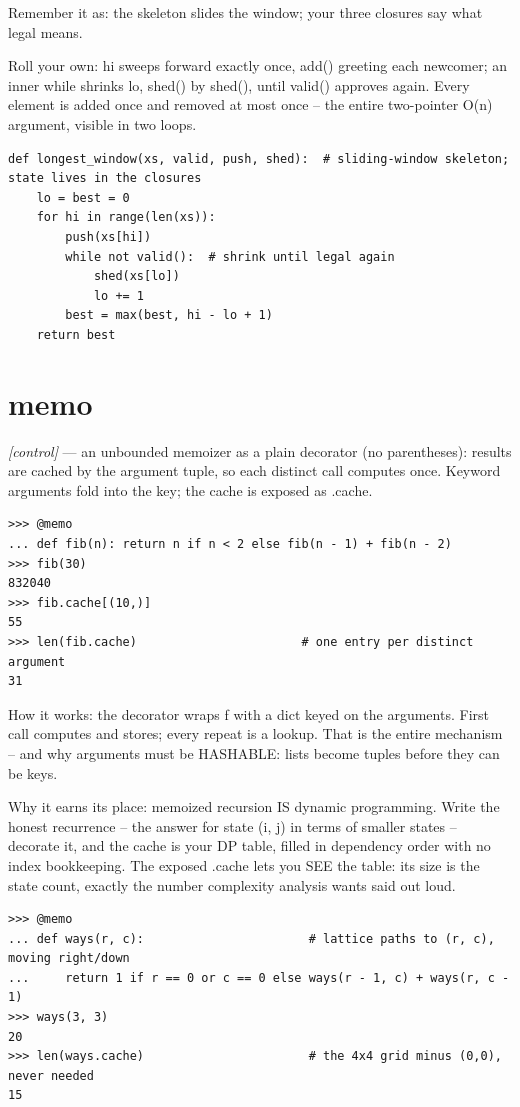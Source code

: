 \documentclass[11pt,letterpaper]{book}
\begin{document}
Remember it as: the skeleton slides the window; your three closures say what legal means.


Roll your own: hi sweeps forward exactly once, add() greeting each newcomer; an inner while shrinks lo, shed() by shed(), until valid() approves again. Every element is added once and removed at most once -- the entire two-pointer O(n) argument, visible in two loops.

\begin{lstlisting}[style=code]
def longest_window(xs, valid, push, shed):  # sliding-window skeleton; state lives in the closures
    lo = best = 0
    for hi in range(len(xs)):
        push(xs[hi])
        while not valid():  # shrink until legal again
            shed(xs[lo])
            lo += 1
        best = max(best, hi - lo + 1)
    return best
\end{lstlisting}

\section{memo}
\noindent\textit{[control]} --- an unbounded memoizer as a plain decorator (no parentheses): results are cached by the argument tuple, so each distinct call computes once. Keyword arguments fold into the key; the cache is exposed as .cache.
\begin{lstlisting}[style=spec]
>>> @memo
... def fib(n): return n if n < 2 else fib(n - 1) + fib(n - 2)
>>> fib(30)
832040
>>> fib.cache[(10,)]
55
>>> len(fib.cache)                       # one entry per distinct argument
31
\end{lstlisting}

How it works: the decorator wraps f with a dict keyed on the arguments. First call computes and stores; every repeat is a lookup. That is the entire mechanism -- and why arguments must be HASHABLE: lists become tuples before they can be keys.


Why it earns its place: memoized recursion IS dynamic programming. Write the honest recurrence -- the answer for state (i, j) in terms of smaller states -- decorate it, and the cache is your DP table, filled in dependency order with no index bookkeeping. The exposed .cache lets you SEE the table: its size is the state count, exactly the number complexity analysis wants said out loud.

\begin{lstlisting}[style=spec]
>>> @memo
... def ways(r, c):                       # lattice paths to (r, c), moving right/down
...     return 1 if r == 0 or c == 0 else ways(r - 1, c) + ways(r, c - 1)
>>> ways(3, 3)
20
>>> len(ways.cache)                       # the 4x4 grid minus (0,0), never needed
15
\end{lstlisting}
\end{document}
